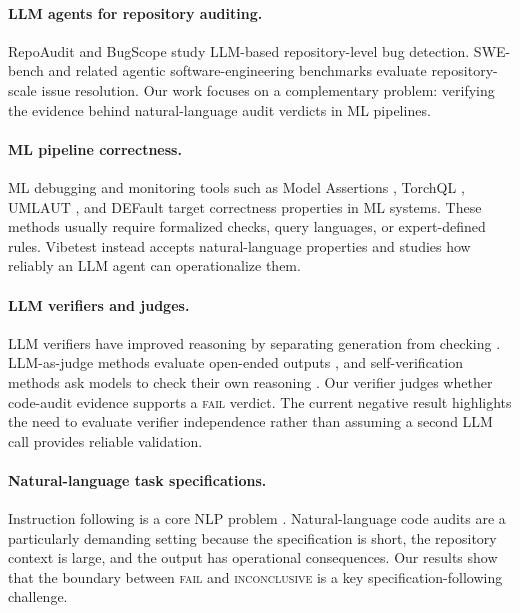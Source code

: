 \documentclass[11pt]{article}
\begin{document}
\paragraph{LLM agents for repository auditing.}
RepoAudit \citep{guo2025repoaudit} and BugScope \citep{liu2025bugscope} study LLM-based repository-level bug detection.
SWE-bench \citep{jimenez2024swebench} and related agentic software-engineering benchmarks evaluate repository-scale issue resolution.
Our work focuses on a complementary problem: verifying the evidence behind natural-language audit verdicts in ML pipelines.

\paragraph{ML pipeline correctness.}
ML debugging and monitoring tools such as Model Assertions \citep{kang2020assertions}, TorchQL \citep{naik2024torchql}, UMLAUT \citep{schoop2021umlaut}, and DEFault \citep{wang2025default} target correctness properties in ML systems.
These methods usually require formalized checks, query languages, or expert-defined rules.
Vibetest instead accepts natural-language properties and studies how reliably an LLM agent can operationalize them.

\paragraph{LLM verifiers and judges.}
LLM verifiers have improved reasoning by separating generation from checking \citep{cobbe2021verifier,lightman2024process}.
LLM-as-judge methods evaluate open-ended outputs \citep{zheng2023judge,tan2025judgebench}, and self-verification methods ask models to check their own reasoning \citep{weng2023selfverification}.
Our verifier judges whether code-audit evidence supports a \textsc{fail} verdict.
The current negative result highlights the need to evaluate verifier independence rather than assuming a second LLM call provides reliable validation.

\paragraph{Natural-language task specifications.}
Instruction following is a core NLP problem \citep{ouyang2022instruct,zhou2023instruction,sclar2024prompt}.
Natural-language code audits are a particularly demanding setting because the specification is short, the repository context is large, and the output has operational consequences.
Our results show that the boundary between \textsc{fail} and \textsc{inconclusive} is a key specification-following challenge.
\end{document}
